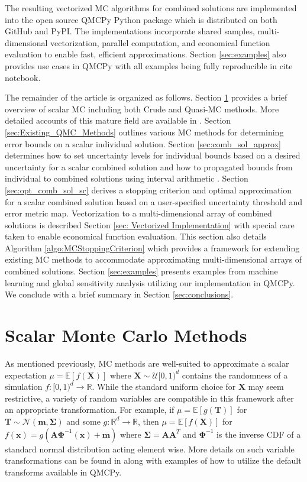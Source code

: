 \documentclass[graybox]{svmult}
\newcommand{\AGSComment}[1]{{\color{brown} #1}}
\begin{document}
The resulting vectorized MC algorithms for combined solutions are implemented into the open source QMCPy Python package \cite{QMCPy} which is distributed on both GitHub and PyPI. The implementations incorporate shared samples, multi-dimensional vectorization, parallel computation, and economical function evaluation to enable fast, efficient approximations. Section \ref{sec:examples} also provides use cases in QMCPy with all examples being fully reproducible in \AGSComment{cite notebook}.

The remainder of the article is organized as follows. Section \ref{sec:MCM} provides a brief overview of scalar MC including both Crude and Quasi-MC methods. More detailed accounts of this mature field are available in \cite{niederreiter1992random,mcbook}. Section \ref{sec:Existing_QMC_Methods} outlines various MC methods for determining error bounds on a scalar individual solution. Section \ref{sec:comb_sol_approx} determines how to set uncertainty levels for individual bounds based on a desired uncertainty for a scalar combined solution and how to propagated bounds from individual to combined solutions using interval arithmetic \cite{interval_analysis}. Section \ref{sec:opt_comb_sol_sc} derives a stopping criterion and optimal approximation for a scalar combined solution based on a user-specified uncertainty threshold and error metric map. Vectorization to a multi-dimensional array of combined solutions is described Section \ref{sec: Vectorized Implementation} with special care taken to enable economical function evaluation. This section also details Algorithm \ref{algo:MCStoppingCriterion} which provides a framework for extending existing MC methods to accommodate approximating multi-dimensional arrays of combined solutions. Section \ref{sec:examples} presents examples from machine learning and global sensitivity analysis utilizing our implementation in QMCPy. We conclude with a brief summary in Section \ref{sec:conclusions}.   

\section{Scalar Monte Carlo Methods} \label{sec:MCM}

As mentioned previously, MC methods are well-suited to approximate a scalar expectation $\mu = \mathbb{E}[f(\boldsymbol{X})]$ where $\boldsymbol{X} \sim \mathcal{U}[0,1)^d$ contains the randomness of a simulation $f: [0,1)^{d} \to \mathbb{R}$. While the standard uniform choice for $\boldsymbol{X}$ may seem restrictive, a variety of random variables are compatible in this framework after an appropriate transformation. For example, if $\mu = \mathbb{E}[g(\boldsymbol{T})]$ for $\boldsymbol{T} \sim \mathcal{N}(\boldsymbol{m},\boldsymbol{\Sigma})$ and some $g: \mathbb{R}^{d} \to \mathbb{R}$, then $\mu = \mathbb{E}[f(\boldsymbol{X})]$ for  $f(\boldsymbol{x})=g(\boldsymbol{A}\boldsymbol{\Phi}^{-1}(\boldsymbol{x})+\boldsymbol{m})$ where $\boldsymbol{\Sigma}=\boldsymbol{A}\boldsymbol{A}^T$ and $\boldsymbol{\Phi}^{-1}$ is the inverse CDF of a standard normal distribution acting element wise. More details on such variable transformations can be found in \cite{QMCSoftware} along with examples of how to utilize the default transforms available in QMCPy.
\end{document}
